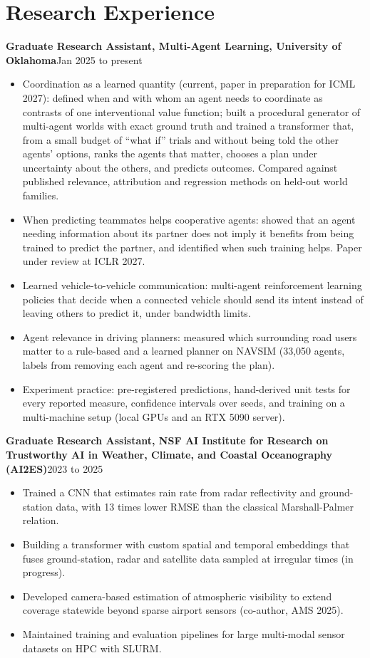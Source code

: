 \documentclass[11pt,letterpaper]{article}
\newcommand{\entry}[2]{\textbf{#1}\hfill #2\par}
\begin{document}
\section{Research Experience}
\entry{Graduate Research Assistant, Multi-Agent Learning, University of Oklahoma}{Jan 2025 to present}
\begin{itemize}
  \item Coordination as a learned quantity (current, paper in preparation for ICML 2027): defined when and with
    whom an agent needs to coordinate as contrasts of one interventional value function; built a procedural
    generator of multi-agent worlds with exact ground truth and trained a transformer that, from a small budget of
    ``what if'' trials and without being told the other agents' options, ranks the agents that matter, chooses a
    plan under uncertainty about the others, and predicts outcomes. Compared against published relevance,
    attribution and regression methods on held-out world families.
  \item When predicting teammates helps cooperative agents: showed that an agent needing information about its
    partner does not imply it benefits from being trained to predict the partner, and identified when such training
    helps. Paper under review at ICLR 2027.
  \item Learned vehicle-to-vehicle communication: multi-agent reinforcement learning policies that decide when a
    connected vehicle should send its intent instead of leaving others to predict it, under bandwidth limits.
  \item Agent relevance in driving planners: measured which surrounding road users matter to a rule-based and a
    learned planner on NAVSIM (33,050 agents, labels from removing each agent and re-scoring the plan).
  \item Experiment practice: pre-registered predictions, hand-derived unit tests for every reported measure,
    confidence intervals over seeds, and training on a multi-machine setup (local GPUs and an RTX 5090 server).
\end{itemize}
\smallskip

\entry{Graduate Research Assistant, NSF AI Institute for Research on Trustworthy AI in Weather, Climate, and
Coastal Oceanography (AI2ES)}{2023 to 2025}
\begin{itemize}
  \item Trained a CNN that estimates rain rate from radar reflectivity and ground-station data, with 13 times
    lower RMSE than the classical Marshall-Palmer relation.
  \item Building a transformer with custom spatial and temporal embeddings that fuses ground-station, radar and
    satellite data sampled at irregular times (in progress).
  \item Developed camera-based estimation of atmospheric visibility to extend coverage statewide beyond sparse
    airport sensors (co-author, AMS 2025).
  \item Maintained training and evaluation pipelines for large multi-modal sensor datasets on HPC with SLURM.
\end{itemize}
\smallskip
\end{document}
